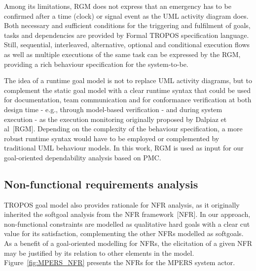 Among its limitations, RGM does not express that an emergency has to be confirmed after a time (clock) or signal event as the UML activity diagram does. Both necessary and sufficient conditions for the triggering and fulfilment of goals, tasks and dependencies are provided by Formal TROPOS specification language.  Still, sequential, interleaved, alternative, optional and conditional execution flows as well as multiple executions of the same task can be expressed by the RGM, providing a rich behaviour specification for the system-to-be.


The idea of a runtime goal model is not to replace UML activity diagrams, but to complement the static goal model with a clear runtime syntax that could be used for 
documentation, team communication and for conformance verification at both design time - e.g., through model-based verification - and during system execution - as the execution monitoring originally proposed by Dalpiaz et al~[RGM]. Depending on the complexity of the behaviour specification, a more robust runtime syntax would have to be employed or complemented by traditional UML behaviour models. In this work, RGM is used as input for our goal-oriented dependability analysis based on PMC.




\subsection{Non-functional requirements analysis}


TROPOS goal model also provides rationale for NFR analysis, as it originally inherited the softgoal analysis from the NFR framework~[NFR]. In our approach, non-functional constraints are modelled as qualitative hard goals with a clear cut value for its satisfaction, complementing the other NFRs modelled as softgoals. As a benefit of a goal-oriented modelling for NFRs, the elicitation of a given NFR may be justified by its relation to other elements in the model. Figure~\ref{fig:MPERS_NFR} presents the NFRs for the MPERS system actor.

